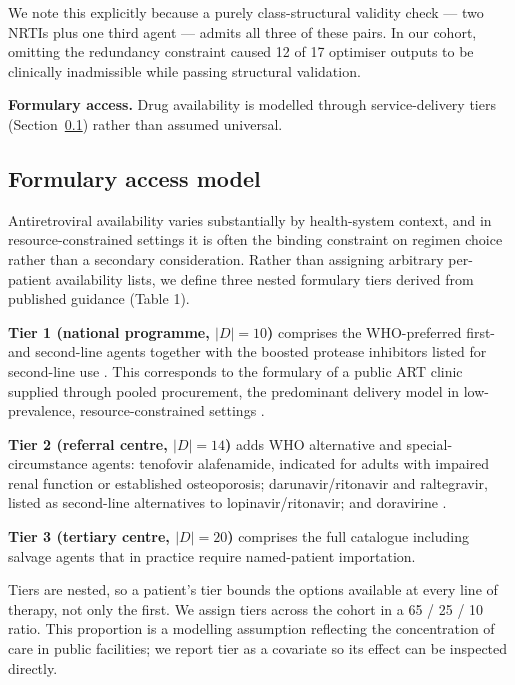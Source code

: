 \documentclass[conference]{IEEEtran}
\begin{document}
We note this explicitly because a purely class-structural validity check --- two NRTIs plus one third agent --- admits all three of these pairs. In our cohort, omitting the redundancy constraint caused 12 of 17 optimiser outputs to be clinically inadmissible while passing structural validation.

\textbf{Formulary access.} Drug availability is modelled through service-delivery tiers (Section~\ref{sec:formulary}) rather than assumed universal.

\subsection{Formulary access model}\label{sec:formulary}

Antiretroviral availability varies substantially by health-system context, and in resource-constrained settings it is often the binding constraint on regimen choice rather than a secondary consideration. Rather than assigning arbitrary per-patient availability lists, we define three nested formulary tiers derived from published guidance (Table 1).

\textbf{Tier 1 (national programme, $|D| = 10$)} comprises the WHO-preferred first- and second-line agents together with the boosted protease inhibitors listed for second-line use \cite{who2021consolidated,who2018update,who2025eml}. This corresponds to the formulary of a public ART clinic supplied through pooled procurement, the predominant delivery model in low-prevalence, resource-constrained settings \cite{unaids2024mena}.

\textbf{Tier 2 (referral centre, $|D| = 14$)} adds WHO alternative and special-circumstance agents: tenofovir alafenamide, indicated for adults with impaired renal function or established osteoporosis; darunavir/ritonavir and raltegravir, listed as second-line alternatives to lopinavir/ritonavir; and doravirine \cite{who2018update}.

\textbf{Tier 3 (tertiary centre, $|D| = 20$)} comprises the full catalogue including salvage agents that in practice require named-patient importation.

Tiers are nested, so a patient's tier bounds the options available at every line of therapy, not only the first. We assign tiers across the cohort in a 65 / 25 / 10 ratio. This proportion is a modelling assumption reflecting the concentration of care in public facilities; we report tier as a covariate so its effect can be inspected directly.
\end{document}
